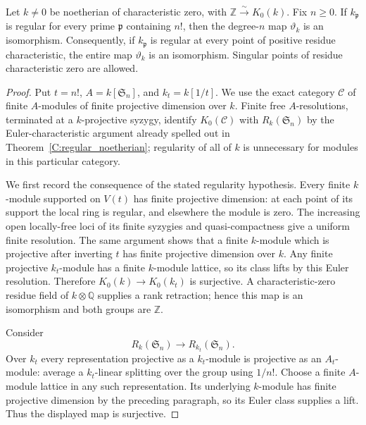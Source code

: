 \begin{theorem}
\label{C:regular_modular_locus}
Let $k\ne0$ be noetherian of characteristic zero, with
$\mathbb Z\xrightarrow{\sim}K_0(k)$. Fix $n\geq0$. If $k_{\mathfrak p}$
is regular for every prime $\mathfrak p$ containing $n!$, then the
degree-$n$ map $\vartheta_k$ is an isomorphism.
Consequently, if $k_{\mathfrak p}$ is regular at every point of positive
residue characteristic, the entire map $\vartheta_k$ is an isomorphism.
Singular points of residue characteristic zero are allowed.
\end{theorem}
\begin{proof}
Put $t=n!$, $A=k[\mathfrak S_n]$, and $k_t=k[1/t]$.
We use the exact category $\mathcal C$ of finite $A$-modules of finite
projective dimension over $k$. Finite free $A$-resolutions, terminated
at a $k$-projective syzygy, identify $K_0(\mathcal C)$ with
$R_k(\mathfrak S_n)$ by the Euler-characteristic argument already
spelled out in Theorem~\ref{C:regular_noetherian}; regularity of all of
$k$ is unnecessary for modules in this particular category.

We first record the consequence of the stated regularity hypothesis.
Every finite $k$-module supported on $V(t)$ has finite projective
dimension: at each point of its support the local ring is regular,
and elsewhere the module is zero. The increasing open locally-free
loci of its finite syzygies and quasi-compactness give a uniform finite
resolution. The same argument shows that a finite $k$-module which is
projective after inverting $t$ has finite projective dimension over $k$.
Any finite projective $k_t$-module has a finite $k$-module lattice, so
its class lifts by this Euler resolution. Therefore
$K_0(k)\to K_0(k_t)$ is surjective. A characteristic-zero residue field
of $k\otimes\mathbb Q$ supplies a rank retraction; hence this map is an
isomorphism and both groups are $\mathbb Z$.

Consider
\[
 R_k(\mathfrak S_n)\longrightarrow R_{k_t}(\mathfrak S_n).
\]
Over $k_t$ every representation projective as a $k_t$-module is
projective as an $A_t$-module: average a $k_t$-linear splitting over
the group using $1/n!$. Choose a finite $A$-module lattice in any such
representation. Its underlying $k$-module has finite projective dimension
by the preceding paragraph, so its Euler class supplies a lift. Thus
the displayed map is surjective.


\end{proof}
